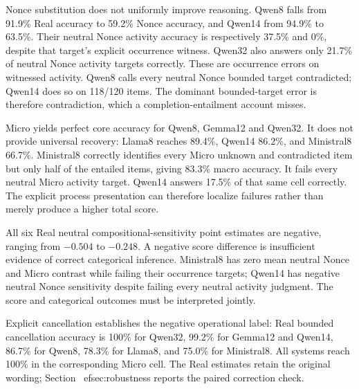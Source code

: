 \documentclass[sigconf,anonymous,review]{acmart}
\begin{document}
Nonce substitution does not uniformly improve reasoning. Qwen8 falls from 91.9\% Real accuracy to 59.2\% Nonce accuracy, and Qwen14 from 94.9\% to 63.5\%. Their neutral Nonce activity accuracy is respectively 37.5\% and 0\%, despite that target's explicit occurrence witness. Qwen32 also answers only 21.7\% of neutral Nonce activity targets correctly. These are occurrence errors on witnessed activity. Qwen8 calls every neutral Nonce bounded target contradicted; Qwen14 does so on 118/120 items. The dominant bounded-target error is therefore contradiction, which a completion-entailment account misses.

Micro yields perfect core accuracy for Qwen8, Gemma12 and Qwen32. It does not provide universal recovery: Llama8 reaches 89.4\%, Qwen14 86.2\%, and Ministral8 66.7\%. Ministral8 correctly identifies every Micro unknown and contradicted item but only half of the entailed items, giving 83.3\% macro accuracy. It fails every neutral Micro activity target. Qwen14 answers 17.5\% of that same cell correctly. The explicit process presentation can therefore localize failures rather than merely produce a higher total score.

All six Real neutral compositional-sensitivity point estimates are negative, ranging from $-0.504$ to $-0.248$. A negative score difference is insufficient evidence of correct categorical inference. Ministral8 has zero mean neutral Nonce and Micro contrast while failing their occurrence targets; Qwen14 has negative neutral Nonce sensitivity despite failing every neutral activity judgment. The score and categorical outcomes must be interpreted jointly.

Explicit cancellation establishes the negative operational label: Real bounded cancellation accuracy is 100\% for Qwen32, 99.2\% for Gemma12 and Qwen14, 86.7\% for Qwen8, 78.3\% for Llama8, and 75.0\% for Ministral8. All systems reach 100\% in the corresponding Micro cell. The Real estimates retain the original wording; Section~
ef{sec:robustness} reports the paired correction check.
\end{document}
